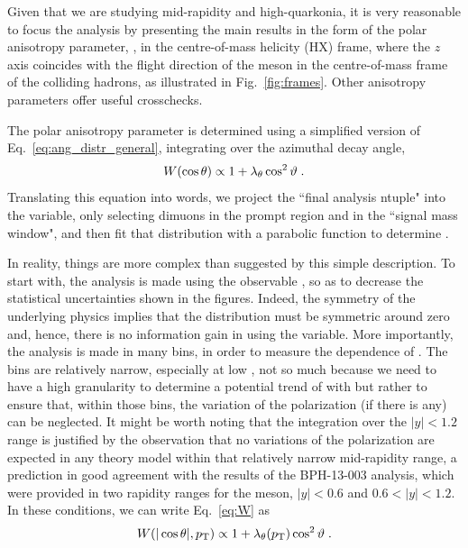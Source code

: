 Given that we are studying mid-rapidity and high-\pt quarkonia,
it is very reasonable to focus the analysis by presenting the main results 
in the form of the polar anisotropy parameter, \lth,
in the centre-of-mass helicity (HX) frame,
where the $z$ axis coincides with the flight direction of the meson in
the centre-of-mass frame of the colliding hadrons, 
as illustrated in Fig.~\ref{fig:frames}.
Other anisotropy parameters offer useful crosschecks.

The polar anisotropy parameter is determined using a simplified version of
Eq.~\ref{eq:ang_distr_general}, integrating over the azimuthal decay angle,
\begin{equation}
W(\cos\theta) \propto 1+\lambda_\theta \cos^2 \vartheta \; .
\label{eq:W}
\end{equation}
Translating this equation into words, we project the ``final analysis ntuple" into
the \costh variable, only selecting dimuons in the prompt region and in the 
\jpsi ``signal mass window", and then fit that distribution with a parabolic function
to determine \lth.

In reality, things are more complex than suggested by this simple description.
To start with, the analysis is made using the observable \abscosth, 
so as to decrease the statistical uncertainties shown in the figures.
Indeed, the symmetry of the underlying physics implies that the distribution 
must be symmetric around zero and, hence, there is no information gain in using
the \costh variable.
More importantly, the analysis is made in many \pt bins,
in order to measure the \pt dependence of \lth.
The \pt bins are relatively narrow, especially at low \pt,
not so much because we need to have 
a high granularity to determine a potential trend of \lth with \pt 
but rather to ensure that, within those bins, the variation of the polarization 
(if there is any) can be neglected.
It might be worth noting that the integration over the $|y| < 1.2$ range is 
justified by the observation that no variations of the polarization are 
expected in any theory model within that relatively narrow mid-rapidity range,
a prediction in good agreement with the results of the BPH-13-003 analysis,
which were provided in two rapidity ranges for the \jpsi meson, 
$|y| < 0.6$ and $0.6 < |y| < 1.2$.
In these conditions, we can write
Eq.~\ref{eq:W} as
\begin{equation}
W(|\cos\theta|,p_\text{T}) \propto 1+\lambda_\theta(p_\text{T}) \cos^2 \vartheta \; .
\label{eq:wfit}
\end{equation}

